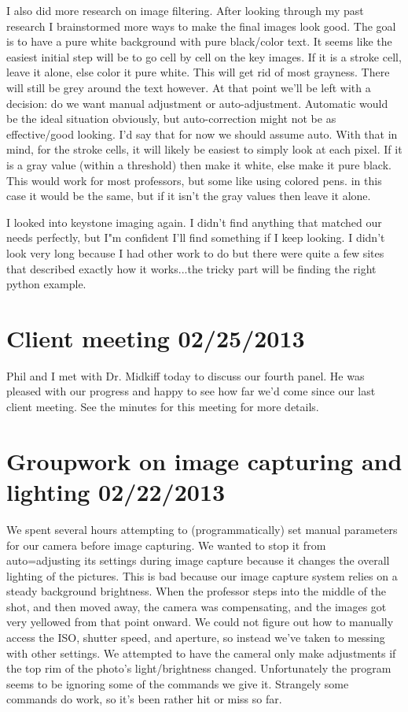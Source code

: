 \documentclass[]{article}
\begin{document}
	I also did more research on image filtering. After looking through my past research I brainstormed more ways to make the final images look good. The goal is to have a pure white background with pure black/color text. It seems like the easiest initial step will be to go cell by cell on the key images. If it is a stroke cell, leave it alone, else color it pure white. This will get rid of most grayness. There will still be grey around the text however. 
	At that point we'll be left with a decision: do we want manual adjustment or auto-adjustment. Automatic would be the ideal situation obviously, but auto-correction might not be as effective/good looking.
	I'd say that for now we should assume auto. With that in mind, for the stroke cells, it will likely be easiest to simply look at each pixel. If it is a gray value (within a threshold) then make it white, else make it pure black. This would work for most professors, but some like using colored pens. in this case it would be the same, but if it isn't the gray values then leave it alone.
	
	I looked into keystone imaging again. I didn't find anything that matched our needs perfectly, but I"m confident I'll find something if I keep looking. I didn't look very long because I had other work to do but there were quite a few sites that described exactly how it works...the tricky part will be finding the right python example.
	
	\section{Client meeting 02/25/2013}
	
	Phil and I met with Dr. Midkiff today to discuss our fourth panel. He was pleased with our progress and happy to see how far we'd come since our last client meeting. See the minutes for this meeting for more details.
	
	\section{Groupwork on image capturing and lighting 02/22/2013}
	
	We spent several hours attempting to (programmatically) set manual parameters for our camera before image capturing. We wanted to stop it from auto=adjusting its settings during image capture because it changes the overall lighting of the pictures. This is bad because our image capture system relies on a steady background brightness. When the professor steps into the middle of the shot, and then moved away, the camera was compensating, and the images got very yellowed from that point onward. We could not figure out how to manually access the ISO, shutter speed, and aperture, so instead we've taken to messing with other settings. We attempted to have the cameral only make adjustments if the top rim of the photo's light/brightness changed. Unfortunately the program seems to be ignoring some of the commands we give it. Strangely some commands do work, so it's been rather hit or miss so far.
	
\end{document}
